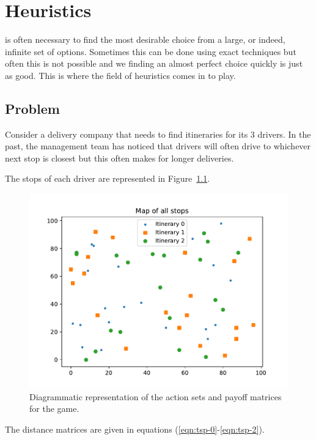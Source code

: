 \chapter[Heuristics]{Heuristics}

 is often necessary to find the most desirable choice from
a large, or indeed, infinite set of options. Sometimes this can be done using
exact techniques but often this is not possible and we finding an almost perfect
choice quickly is just as good. This is where the field of heuristics comes in
to play.

\section{Problem}\label{sec:problem}

Consider a delivery company that needs to find itineraries for its 3 drivers. In
the past, the management team has noticed that drivers will often drive to
whichever next stop is closest but this often makes for longer deliveries.

The stops of each driver are represented in Figure~\ref{fig:tsp}.

\begin{figure}
\begin{center}
\includegraphics[width=.8\textwidth]{./assets/tsp/main.pdf}
\end{center}
\caption{Diagrammatic representation of the action sets and payoff matrices for
    the game.}
\label{fig:tsp}
\end{figure}

The distance matrices are given in equations (\ref{eqn:tsp-0}-\ref{eqn:tsp-2}).

\begin{landscape}
    \footnotesize{
        
    }
\end{landscape}

